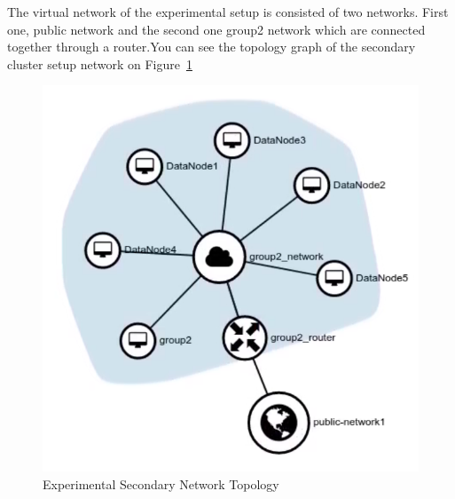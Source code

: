 The virtual network of the experimental setup is consisted of two networks. First one, public network and the second one group2 network which are connected together through a router.You can see the topology graph of the secondary cluster setup network on Figure~\ref{fig:topology}

\begin{figure}[t]
   \centering
   \includegraphics[width=\linewidth]{fig/NetworkTopology.png}
    \caption{Experimental Secondary Network Topology}
    \label{fig:topology}
\end{figure}